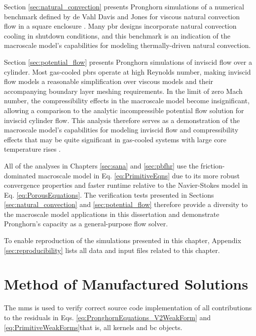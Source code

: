 Section \ref{sec:natural_convection} presents Pronghorn simulations of a numerical benchmark defined by de Vahl Davis and Jones for viscous natural convection flow in a square enclosure \cite{davis}. Many \gls{pbr} designs incorporate natural convection cooling in shutdown conditions, and this benchmark is an indication of the macroscale model's capabilities for modeling thermally-driven natural convection.

Section \ref{sec:potential_flow} presents Pronghorn simulations of inviscid flow over a cylinder. Most gas-cooled \glspl{pbr} operate at high Reynolds number, making inviscid flow models a reasonable simplification over viscous models and their accompanying boundary layer meshing requirements. In the limit of zero Mach number, the compressibility effects in the macroscale model become insignificant, allowing a comparison to the analytic incompressible potential flow solution for inviscid cylinder flow. This analysis therefore serves as a demonstration of the macroscale model's capabilities for modeling inviscid flow and compressibility effects that may be quite significant in gas-cooled systems with large core temperature rises \cite{martineau}.

All of the analyses in Chapters \ref{sec:sana} and \ref{sec:pbfhr} use the friction-dominated macroscale model in Eq. \eqref{eq:PrimitiveEqns} due to its more robust convergence properties and faster runtime relative to the Navier-Stokes model in Eq. \eqref{eq:PorousEquations}. The verification tests presented in Sections \ref{sec:natural_convection} and \ref{sec:potential_flow} therefore provide a diversity to the macroscale model applications in this dissertation and demonstrate Pronghorn's capacity as a general-purpose flow solver.

To enable reproduction of the simulations presented in this chapter, Appendix \ref{sec:reproducibility} lists all data and input files related to this chapter.

\section{Method of Manufactured Solutions}
\label{sec:mms}

The \gls{mms} is used to verify correct source code implementation of all contributions to the residuals in Eqs. \eqref{eq:PronghornEquations_V2WeakForm} and \eqref{eq:PrimitiveWeakForms}\mdash that is, all kernels and \gls{bc} objects.

